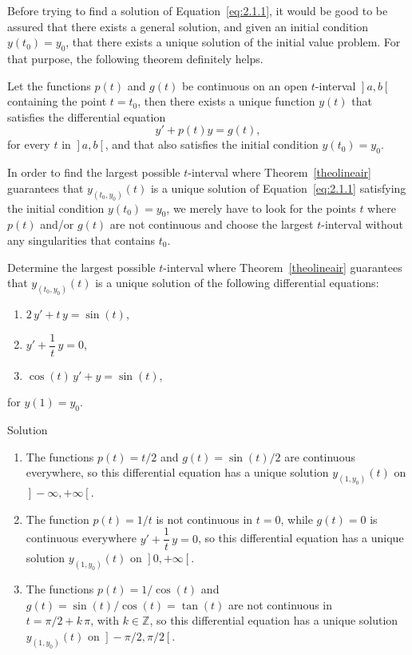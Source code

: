 Before trying to find a solution of Equation~\eqref{eq:2.1.1}, it would be good to be assured that there exists a general solution, and given an initial condition $y(t_0)=y_0$, that there exists a unique solution of the initial value problem. For that purpose, the following theorem definitely helps.

\begin{theorem}
\label{theolineair}
Let the functions $p(t)$ and $g(t)$ be continuous on an open $t$-interval $\left.\right]a,b\left[\right.$ containing the point $t=t_0$, then there exists a unique function $y(t)$ that satisfies the differential equation
$$
y'+p(t)y=g(t),
$$
for every $t$ in $\left.\right]a,b\left[\right.$, and that also satisfies the initial condition $y\left(t_0\right)=y_0$.
\end{theorem}

In order to find the largest possible $t$-interval where Theorem~\ref{theolineair} guarantees that $y_{(t_0,y_0)}(t)$ is a unique solution of Equation~\eqref{eq:2.1.1} satisfying the initial condition $y\left(t_0\right)=y_0$, we merely have to look for the points $t$ where $p(t)$ and/or $g(t)$ are not continuous and choose the largest $t$-interval without any singularities  that contains $t_0$.

\begin{example}
Determine the largest possible $t$-interval where Theorem~\ref{theolineair} guarantees that $y_{(t_0,y_0)}(t)$ is a unique solution of the following differential equations:
\begin{enumerate}
	\item $2\,y'+t\,y=\sin(t)$,
	\item $y'+\dfrac{1}{t}\,y=0$,
	\item $\cos(t)\,y'+y=\sin(t)$,
\end{enumerate}
for $y(1)=y_0$.

Solution 

\begin{enumerate}
	\item The functions $p(t)=t/2$ and $g(t)=\sin(t)/2$ are continuous everywhere, so this differential equation has a unique solution $y_{(1,y_0)}(t)$ on $\left.\right]-\infty,+\infty\left[\right.$.
	\item The function $p(t)=1/t$ is not continuous in $t=0$, while $g(t)=0$ is continuous everywhere $y'+\dfrac{1}{t}\,y=0$, so this differential equation has a unique solution $y_{(1,y_0)}(t)$ on $\left.\right]0,+\infty\left[\right.$.
	\item The functions $p(t)=1/\cos(t)$ and $g(t)=\sin(t)/\cos(t)=\tan(t)$  are not continuous in\\ $t=\pi/2+k\,\pi$, with $k\in\mathbb{Z}$, so this differential equation has a unique solution $y_{(1,y_0)}(t)$ on $\left.\right]-\pi/2,\pi/2\left[\right.$.
\end{enumerate}


\end{example}


